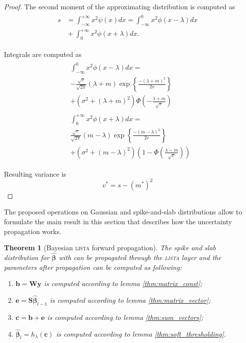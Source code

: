 \documentclass[letterpaper]{article}
\newtheorem{theorem}{Theorem}
\begin{document}
\begin{proof}
The second moment of the approximating distribution is computed as
\begin{align}
\begin{split}
s &= \int_{-\infty}^{+\infty}x^2\psi(x)dx = \int_{-\infty}^{0}x^2\phi(x-\lambda)dx \\
&{}+ \int_{0}^{+\infty}x^2\phi(x+\lambda)dx.
\end{split}
\end{align}

Integrals are computed as
\begin{align}
\begin{split}
&\int_{-\infty}^{0}x^2\phi(x-\lambda)dx = \\
&-\frac{\sqrt{v}}{\sqrt{2\pi}} (\lambda+m)\exp\left\{\frac{-(\lambda+m)^2}{2v}\right\}\\
& + (\sigma^2 + (\lambda+m)^2)\Phi\left(-\frac{\lambda+m}{\sqrt{v}}\right)
\end{split}\\
\begin{split}
&\int_{0}^{+\infty}x^2\phi(x+\lambda)dx = \\
&\frac{\sqrt{v}}{\sqrt{2\pi}} (m - \lambda)\exp\left\{\frac{-(m - \lambda)^2}{2v}\right\}\\
& + (\sigma^2 + (m - \lambda)^2)\left(1 - \Phi\left(\frac{\lambda -m}{\sqrt{v}}\right)\right)
\end{split}
\end{align}

Resulting variance is
\begin{equation}
v^* = s- (m^*)^2
\end{equation}

\end{proof}

The proposed operations on Gaussian and spike-and-slab distributions allow to formulate the main result in this section that describes how the uncertainty propagation works.
\begin{theorem}[Bayesian \textsc{lista} forward propagation]
\label{thm:prob_layer}
The spike and slab distribution for $\widehat{\boldsymbol\beta}$ with can be propagated through the \textsc{lista} layer and the parameters after propagation can be computed as following:
\begin{enumerate}
	\item $\mathbf{b} = \mathbf{W}\mathbf{y}$ is computed according to lemma \ref{thm:matrix_const};
	\item $\mathbf{e} = \mathbf{S}\widehat{\boldsymbol\beta}_{l-1}$ is computed according to lemma \ref{thm:matrix_vector};
	\item $\mathbf{c} = \mathbf{b} + \mathbf{e}$ is computed according to lemma \ref{thm:sum_vectors};
	\item $\widehat{\boldsymbol\beta}_{l} = h_\lambda(\mathbf{c})$ is computed according to lemma \ref{thm:soft_thresholding}.
\end{enumerate}
\end{theorem}
\end{document}
